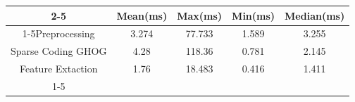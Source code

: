 \documentclass{standalone}
\begin{document}
 
 \begin{tabular}{|c |c |c |c |c |}
\cline{2-5}\cline{2-5} \multicolumn{1}{c |}{ } & Mean(ms) & Max(ms) & Min(ms) & Median(ms)\\ 
\cline{1-5}Preprocessing & 3.274 & 77.733 & 1.589 & 3.255\\ 
 \hhline{|=|=|=|=|=|}Sparse Coding GHOG & 4.28 & 118.36 & 0.781 & 2.145\\ 
 \hhline{|=|=|=|=|=|}Feature Extaction & 1.76 & 18.483 & 0.416 & 1.411\\ 
 \cline{1-5}\hline \end{tabular}
 
\end{document}
